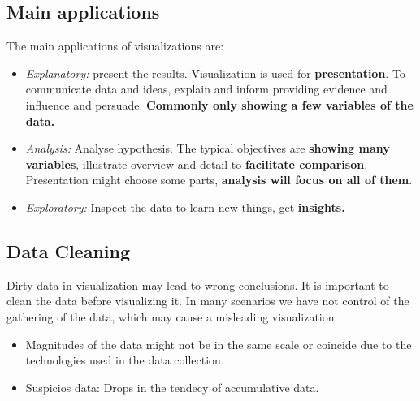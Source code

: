 \documentclass{article}
\begin{document}
\subsection{Main applications}
The main applications of visualizations are: 
\begin{itemize}
    \item \textit{Explanatory:} present the results. Visualization is used for \textbf{presentation}. To communicate data and ideas, explain and inform providing evidence and influence and persuade. \textbf{Commonly only showing a few variables of the data.}
    \item \textit{Analysis:} Analyse hypothesis. The typical objectives are \textbf{showing many variables}, illustrate overview and detail to \textbf{facilitate comparison}. Presentation might choose some parts, \textbf{analysis will focus on all of them}.
    \item \textit{Exploratory:} Inspect the data to learn new things, get \textbf{insights.}
\end{itemize}

\subsection{Data Cleaning}
Dirty data in visualization may lead to wrong conclusions. It is important to clean the data before visualizing it. In many scenarios we have not control of the gathering of the data, which may cause a misleading visualization.
\begin{itemize}
  \item Magnitudes of the data might not be in the same scale or coincide due to the technologies used in the data collection.
  \item Suspicios data: Drops in the tendecy of accumulative data.
\end{itemize}

\end{document}
